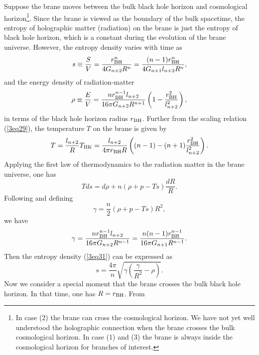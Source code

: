\documentclass[a4paper,12pt]{article}
\begin{document}
Suppose the brane moves between the bulk black hole horizon and
cosmological horizon\footnote{In case (2) the brane can cross the
cosmological horizon. We have not yet well understood the
holographic connection when the brane crosses the bulk cosmological horizon. 
In case (1) and (3) the
brane is always inside the cosmological horizon for branches of
interest.}. Since the brane is viewed as the boundary of the bulk
spacetime, the entropy of holographic matter (radiation)
on the brane is just the entropy of black hole horizon, which is a
constant during the evolution of the brane universe. However, the
entropy density varies with time as
\begin{equation}
\label{3eq31}
 s \equiv \frac{S}{V}=\frac{r_{\rm BH}^n}{4G_{n+2}R^n}
    =\frac{(n-1)r_{\rm BH}^n}{4G_{n+1}l_{n+2}R^n},
\end{equation}
and the energy density of radiation-matter
\begin{equation}
\rho \equiv \frac{E}{V}=\frac{n r_{\rm BH}^{n-1}l_{n+2}}{16\pi G_{n+2}
R^{n+1}} \left (1-\frac{r_{\rm BH}^2}{l^2_{n+2}}\right),
\end{equation}
in terms of the black hole horizon radius $r_{\rm BH}$. Further from the
scaling relation (\ref{3eq29}), the temperature $T$ on
the brane is given by
\begin{equation}
\label{3eq33}
 T=\frac{l_{n+2}}{R}T_{\rm HK}=\frac{l_{n+2}}{4\pi
  r_{\rm BH}R}\left((n-1)-(n+1)\frac{r_{\rm BH}^2}{l^2_{n+2}}\right).
\end{equation}
Applying the first law of thermodynamics to the radiation matter
in the brane universe, one has
\begin{equation}
Tds = d\rho +n(\rho +p -T s)\frac{dR}{R}.
\end{equation}
Following \cite{SV} and defining
\begin{equation}
\gamma = \frac{n}{2}(\rho +p -Ts)R^2,
\end{equation}
we have
\begin{equation}
\label{3eq36}
 \gamma =\frac{nr_{\rm BH}^{n-1}l_{n+2}}{16\pi
G_{n+2}R^{n-1}}
       =\frac{n(n-1)r_{\rm BH}^{n-1}}{16\pi G_{n+1} R^{n-1}}.
 \end{equation}
Then the entropy density (\ref{3eq31}) can be
expressed as
\begin{equation}
\label{3eq37}
 s=\frac{4\pi }{n}\sqrt{\gamma
\left(\frac{\gamma}{R^2}-\rho \right)}.
\end{equation}
Now we consider a special moment that the brane crosses the bulk
black hole horizon. In that time, one has $R=r_{\rm BH}$. From
\end{document}
